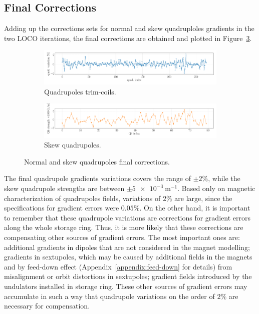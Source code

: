 \subsection{Final Corrections}
Adding up the corrections sets for normal and skew quadruploles gradients in the two LOCO iterations, the final corrections are obtained and plotted in Figure~\ref{fig:loco_corrections_final}.
\begin{figure}
\centering
\begin{subfigure}[t]{1.0\textwidth}
\includegraphics[width=1.0\textwidth]{figures/loco_quad_corrections_errorbar_big.pdf}
    \caption{Quadrupoles trim-coils.}
    \label{subfig:quad_fit_final}
\end{subfigure}
 \begin{subfigure}[t]{1.0\textwidth}
\includegraphics[width=1.0\textwidth]{figures/loco_qs_corrections_errorbar_big.pdf}
    \caption{Skew quadrupoles.}
    \label{subfig:qs_fit_final}
\end{subfigure}
\caption{Normal and skew quadrupoles final corrections.}
\label{fig:loco_corrections_final}
\end{figure}

The final quadrupole gradients variations covers the range of $\pm 2\%$, while the skew quadrupole strengths are between $\pm \SI{5e-3}{\meter^{-1}}$. Based only on magnetic characterization of quadrupoles fields, variations of $2\%$ are large, since the specifications for gradient errors were $0.05\%$. On the other hand, it is important to remember that these quadrupole variations are corrections for gradient errors along the whole storage ring. Thus, it is more likely that these corrections are compensating other sources of gradient errors. The most important ones are: additional gradients in dipoles that are not considered in the magnet modelling; gradients in sextupoles, which may be caused by additional fields in the magnets and by feed-down effect (Appendix~\ref{appendix:feed-down} for details) from misalignment or orbit distortions in sextupoles; gradient fields introduced by the undulators installed in storage ring. These other sources of gradient errors may accumulate in such a way that quadrupole variations on the order of $2\%$ are necessary for compensation.

